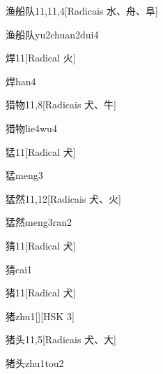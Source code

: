 \begin{entry}{渔船队}{11,11,4}[Radicais ⽔、⾈、⾩]
  \begin{phonetics}{渔船队}{yu2chuan2dui4}
  \end{phonetics}
\end{entry}

\begin{entry}{焊}{11}[Radical ⽕]
  \begin{phonetics}{焊}{han4}
  \end{phonetics}
\end{entry}

\begin{entry}{猎物}{11,8}[Radicais ⽝、⽜]
  \begin{phonetics}{猎物}{lie4wu4}
  \end{phonetics}
\end{entry}

\begin{entry}{猛}{11}[Radical ⽝]
  \begin{phonetics}{猛}{meng3}
  \end{phonetics}
\end{entry}

\begin{entry}{猛然}{11,12}[Radicais ⽝、⽕]
  \begin{phonetics}{猛然}{meng3ran2}
  \end{phonetics}
\end{entry}

\begin{entry}{猜}{11}[Radical ⽝]
  \begin{phonetics}{猜}{cai1}
  \end{phonetics}
\end{entry}

\begin{entry}{猪}{11}[Radical ⽝]
  \begin{phonetics}{猪}{zhu1}[][HSK 3]
  \end{phonetics}
\end{entry}

\begin{entry}{猪头}{11,5}[Radicais ⽝、⼤]
  \begin{phonetics}{猪头}{zhu1tou2}
  \end{phonetics}
\end{entry}

